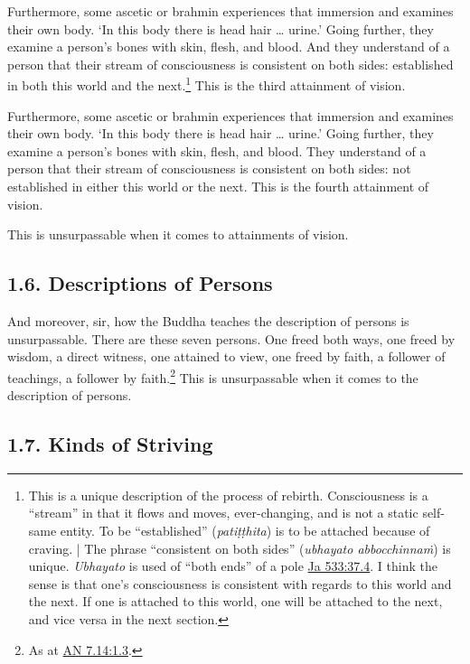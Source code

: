 \documentclass[12pt,openany]{book}%
\begin{document}
Furthermore, some ascetic or brahmin experiences that immersion and examines their own body. ‘In this body there is head hair … urine.’ Going further, they examine a person’s bones with skin, flesh, and blood. And they understand of a person that their stream of consciousness is consistent on both sides: established in both this world and the next.\footnote{This is a unique description of the process of rebirth. Consciousness is a “stream” in that it flows and moves, ever-changing, and is not a static self-same entity. To be “established” (\textit{\textsanskrit{patiṭṭhita}}) is to be attached because of craving. | The phrase “consistent on both sides” (\textit{ubhayato \textsanskrit{abbocchinnaṁ}}) is unique. \textit{Ubhayato} is used of “both ends” of a pole \href{https://suttacentral.net/ja533/en/sujato\#37.4}{Ja 533:37.4}. I think the sense is that one’s consciousness is consistent with regards to this world and the next. If one is attached to this world, one will be attached to the next, and vice versa in the next section. } This is the third attainment of vision. 

Furthermore, some ascetic or brahmin experiences that immersion and examines their own body. ‘In this body there is head hair … urine.’ Going further, they examine a person’s bones with skin, flesh, and blood. They understand of a person that their stream of consciousness is consistent on both sides: not established in either this world or the next. This is the fourth attainment of vision. 

This is unsurpassable when it comes to attainments of vision. 

\subsection*{1.6. Descriptions of Persons }

And moreover, sir, how the Buddha teaches the description of persons is unsurpassable. There are these seven persons. One freed both ways, one freed by wisdom, a direct witness, one attained to view, one freed by faith, a follower of teachings, a follower by faith.\footnote{As at \href{https://suttacentral.net/an7.14/en/sujato\#1.3}{AN 7.14:1.3}. } This is unsurpassable when it comes to the description of persons. 

\subsection*{1.7. Kinds of Striving }
\end{document}
